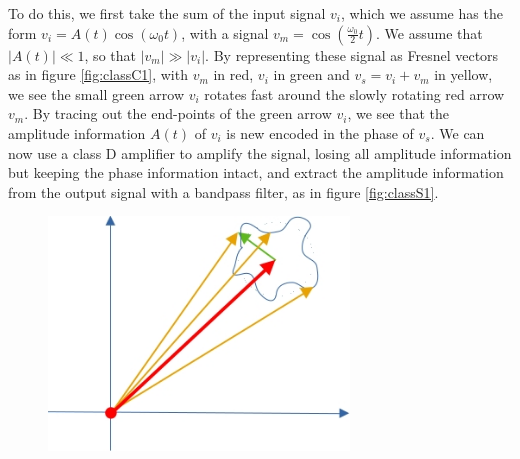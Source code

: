 To do this, we first take the sum of the input signal $v_i$, which we assume has the form $v_i = A(t) \cos(\omega_0 t)$, with a signal $v_m = \cos(\frac{\omega_0}{2} t)$. We assume that $|A(t)| \ll 1$, so that $|v_m| \gg |v_i|$. By representing these signal as Fresnel vectors as in figure \ref{fig:classC1}, with $v_m$ in red, $v_i$ in green and $v_s = v_i + v_m$ in yellow, we see the small green arrow $v_i$ rotates fast around the slowly rotating red arrow $v_m$. By tracing out the end-points of the green arrow $v_i$, we see that the amplitude information $A(t)$ of $v_i$ is new encoded in the phase of $v_s$. We can now use a class D amplifier to amplify the signal, losing all amplitude information but keeping the phase information intact, and extract the amplitude information from the output signal with a bandpass filter, as in figure \ref{fig:classS1}.\\

\begin{figure}[h!]
	\centering
	\includegraphics[width=8cm]{figures/ch09/classS2.jpg}
	\caption{}
	\label{fig:classS2}
\end{figure}


